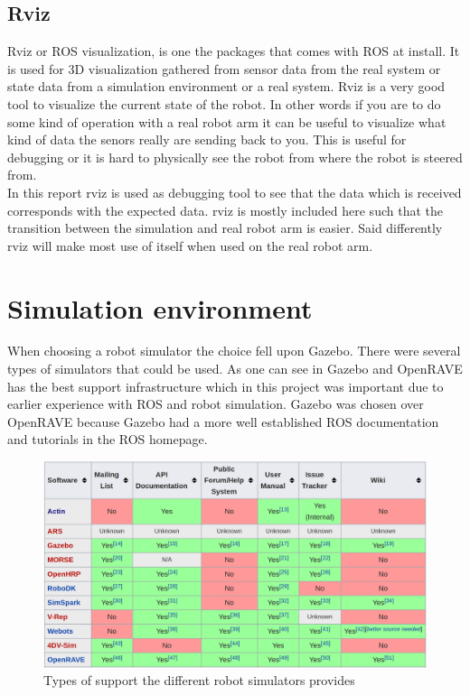 \subsection{Rviz}
Rviz or ROS visualization, is one the packages that comes with ROS at install. It is used for 3D visualization gathered from sensor data from the real system or state data from a simulation environment or a real system. Rviz is a very good tool to visualize the current state of the robot. In other words if you are to do some kind of operation with a real robot arm it can be useful to visualize what kind of data the senors really are sending back to you. This is useful for debugging or it is hard to physically see the robot from where the robot is steered from.\\
In this report rviz is used as debugging tool to see that the data which is received corresponds with the expected data. rviz is mostly included here such that the transition between the simulation and real robot arm is easier. Said differently rviz will make most use of itself when used on the real robot arm\cite{ROSWiki}. 

\section{Simulation environment}
When choosing a robot simulator the choice fell upon Gazebo. There were several types of simulators that could be used. As one can see in  Gazebo and OpenRAVE has the best support infrastructure which in this project was important due to earlier experience with ROS and robot simulation\cite{wikiRobSim}. Gazebo was chosen over OpenRAVE because Gazebo had a more well established ROS documentation and tutorials in the ROS homepage. \\




\begin{figure}[htbp]
  \centering
  \includegraphics[width=.9\textwidth]{img/WikipTableRobSim.png}
  \caption{Types of support the different robot simulators provides\cite{wikiRobSim}}
  \label{fig:infra}
\end{figure}

